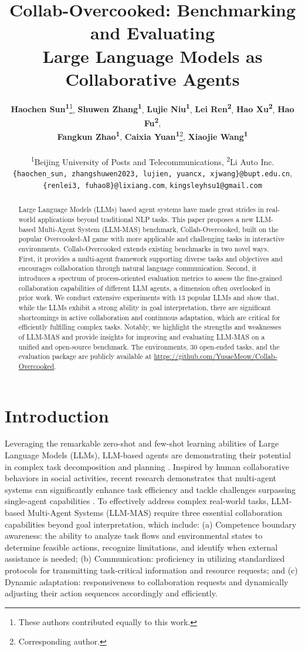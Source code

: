\documentclass[11pt]{article}
\title{Collab-Overcooked: Benchmarking and Evaluating \\ Large Language Models as Collaborative Agents}
\author{
 \textbf{Haochen Sun\textsuperscript{1}}\thanks{These authors contributed equally to this work.},
 \textbf{Shuwen Zhang\textsuperscript{1}}\footnotemark[1],
 \textbf{Lujie Niu\textsuperscript{1}},
 \textbf{Lei Ren\textsuperscript{2}},
 \textbf{Hao Xu\textsuperscript{2}},
 \textbf{Hao Fu\textsuperscript{2}},\\
 \textbf{Fangkun Zhao\textsuperscript{1}},
 \textbf{Caixia Yuan\textsuperscript{1}}\thanks{Corresponding author.},
 \textbf{Xiaojie Wang\textsuperscript{1}}
\\
\\
 \textsuperscript{1}Beijing University of Posts and Telecommunications,
 \textsuperscript{2}Li Auto Inc.
\\
\texttt{\{haochen\_sun, zhangshuwen2023, lujien, yuancx, xjwang\}@bupt.edu.cn},
\\
\texttt{\{renlei3, fuhao8\}@lixiang.com}, \texttt{kingsleyhsu1@gmail.com}
}
\begin{document}
\maketitle
\begin{abstract}
Large Language Models (LLMs) based agent systems have made great strides in real-world applications beyond traditional NLP tasks. This paper proposes a new LLM-based Multi-Agent System (LLM-MAS) benchmark, Collab-Overcooked, built on the popular Overcooked-AI game with more applicable and challenging tasks in interactive environments. Collab-Overcooked extends existing benchmarks in two novel ways. First, it provides a multi-agent framework supporting diverse tasks and objectives and encourages collaboration through natural language communication. Second, it introduces a spectrum of process-oriented evaluation metrics to assess the fine-grained collaboration capabilities of different LLM agents, a dimension often overlooked in prior work. We conduct extensive experiments with 13 popular LLMs and show that, while the LLMs exhibit a strong ability in goal interpretation, there are significant shortcomings in active collaboration and continuous adaptation, which are critical for efficiently fulfilling complex tasks. Notably, we highlight the strengths and weaknesses of LLM-MAS and provide insights for improving and evaluating LLM-MAS on a unified and open-source benchmark. The environments, 30 open-ended tasks, and the evaluation package are publicly available at \url{https://github.com/YusaeMeow/Collab-Overcooked}.



\end{abstract}


\section{Introduction}

Leveraging the remarkable zero-shot and few-shot learning abilities of Large Language Models (LLMs), LLM-based agents are demonstrating their potential in complex task decomposition and planning \cite{wang2023voyager,wang2023describe,li2024embodied}. Inspired by human collaborative behaviors in social activities, recent research demonstrates that multi-agent systems can significantly enhance task efficiency and tackle challenges surpassing single-agent capabilities \cite{li2023camel,hong2023metagpt,zhang2023building}. To effectively address complex real-world tasks, LLM-based Multi-Agent Systems (LLM-MAS) require three essential collaboration capabilities beyond goal interpretation, which include: (a) Competence boundary awareness: the ability to analyze task flows and environmental states to determine feasible actions, recognize limitations, and identify when external assistance is needed; (b) Communication: proficiency in utilizing standardized protocols for transmitting task-critical information and resource requests; and (c) Dynamic adaptation: responsiveness to collaboration requests and dynamically adjusting their action sequences accordingly and efficiently.
\end{document}

